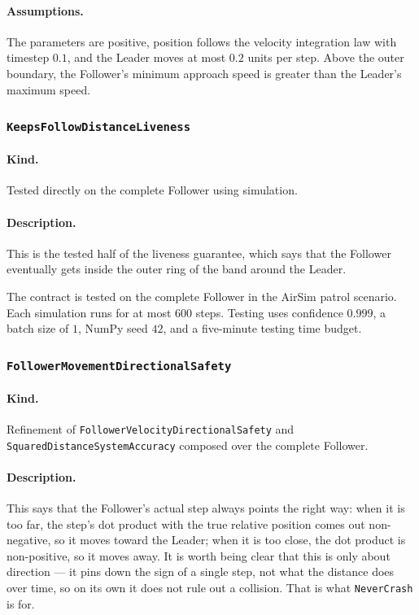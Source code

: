 \documentclass{article}
\begin{document}
\paragraph{Assumptions.} The parameters are positive, position follows the
velocity integration law with timestep $0.1$, and the Leader moves at most $0.2$
units per step. Above the outer boundary, the Follower's minimum approach speed
is greater than the Leader's maximum speed.

\subsubsection{\texttt{KeepsFollowDistanceLiveness}}

\paragraph{Kind.} Tested directly on the complete Follower using simulation.

\paragraph{Description.} This is the tested half of the liveness guarantee, which says that the Follower eventually gets inside the outer ring of the band around the Leader.

The contract is tested on the complete Follower in the AirSim patrol scenario.
Each simulation runs for at most $600$ steps. Testing uses confidence $0.999$, a
batch size of $1$, NumPy seed $42$, and a five-minute testing time budget.

\subsubsection{\texttt{FollowerMovementDirectionalSafety}}

\paragraph{Kind.} Refinement of \texttt{FollowerVelocityDirectionalSafety} and \texttt{SquaredDistanceSystemAccuracy} composed over the complete Follower.

\paragraph{Description.} This says that the Follower's actual step always points the right way: when it is too far, the step's dot product with the true relative position comes out non-negative, so it moves toward the Leader; when it is too close, the dot product is non-positive, so it moves away. It is worth being clear that this is only about direction --- it pins down the sign of a single step, not what the distance does over time, so on its own it does not rule out a collision. That is what \texttt{NeverCrash} is for.
\end{document}

